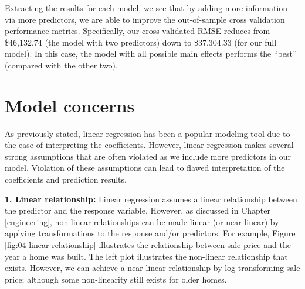 \documentclass[]{krantz}
\begin{document}
Extracting the results for each model, we see that by adding more information via more predictors, we are able to improve the out-of-sample cross validation performance metrics. Specifically, our cross-validated RMSE reduces from \$46,132.74 (the model with two predictors) down to \$37,304.33 (for our full model). In this case, the model with all possible main effects performs the ``best'' (compared with the other two).

\hypertarget{lm-residuals}{%
\section{Model concerns}\label{lm-residuals}}

As previously stated, linear regression has been a popular modeling tool due to the ease of interpreting the coefficients. However, linear regression makes several strong assumptions that are often violated as we include more predictors in our model. Violation of these assumptions can lead to flawed interpretation of the coefficients and prediction results.

\textbf{1. Linear relationship:} Linear regression assumes a linear relationship between the predictor and the response variable. However, as discussed in Chapter \ref{engineering}, non-linear relationships can be made linear (or near-linear) by applying transformations to the response and/or predictors. For example, Figure \ref{fig:04-linear-relationship} illustrates the relationship between sale price and the year a home was built. The left plot illustrates the non-linear relationship that exists. However, we can achieve a near-linear relationship by log transforming sale price; although some non-linearity still exists for older homes.
\end{document}
